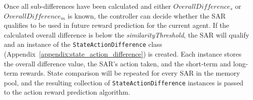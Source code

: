 
Once all sub-differences have been calculated and either $OverallDifference_{s}$ or $OverallDifference_{m}$ is known, the controller can decide whether the SAR qualifies to be used in future reward prediction for the current agent.
If the calculated overall difference is below the \textit{similarityThreshold}, the SAR will qualify and an instance of the \texttt{StateActionDifference} class (Appendix~\ref{appendix:state_action_difference}) is created.
Each instance stores the overall difference value, the SAR's action taken, and the short-term and long-term rewards.
State comparison will be repeated for every SAR in the memory pool, and the resulting collection of \texttt{StateActionDifference} instances is passed to the action reward prediction algorithm.



